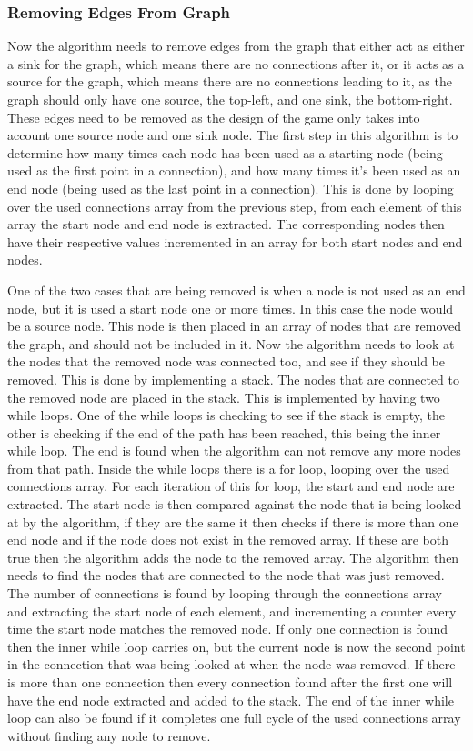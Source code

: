 \subsubsection{Removing Edges From Graph}
	Now the algorithm needs to remove edges from the graph that either act as either a sink for the graph, which means there are no connections after it, or it acts as a source for the graph, which means there are no connections leading to it, as the graph should only have one source, the top-left, and one sink, the bottom-right. These edges need to be removed as the design of the game only takes into account one source node and one sink node. The first step in this algorithm is to determine how many times each node has been used as a starting node (being used as the first point in a connection), and how many times it's been used as an end node (being used as the last point in a connection). This is done by looping over the used connections array from the previous step, from each element of this array the start node and end node is extracted. The corresponding nodes then have their respective values incremented in an array for both start nodes and end nodes.
	\newline
	\par
	One of the two cases that are being removed is when a node is not used as an end node, but it is used a start node one or more times. In this case the node would be a source node. This node is then placed in an array of nodes that are removed the graph, and should not be included in it. Now the algorithm needs to look at the nodes that the removed node was connected too, and see if they should be removed. This is done by implementing a stack. The nodes that are connected to the removed node are placed in the stack. This is implemented by having two while loops. One of the while loops is checking to see if the stack is empty, the other is checking if the end of the path has been reached, this being the inner while loop. The end is found when the algorithm can not remove any more nodes from that path. Inside the while loops there is a for loop, looping over the used connections array. For each iteration of this for loop, the start and end node are extracted. The start node is then compared against the node that is being looked at by the algorithm, if they are the same it then checks if there is more than one end node and if the node does not exist in the removed array. If these are both true then the algorithm adds the node to the removed array. The algorithm then needs to find the nodes that are connected to the node that was just removed. The number of connections is found by looping through the connections array and extracting the start node of each element, and incrementing a counter every time the start node matches the removed node. If only one connection is found then the inner while loop carries on, but the current node is now the second point in the connection that was being looked at when the node was removed. If there is more than one connection then every connection found after the first one will have the end node extracted and added to the stack. The end of the inner while loop can also be found if it completes one full cycle of the used connections array without finding any node to remove.

